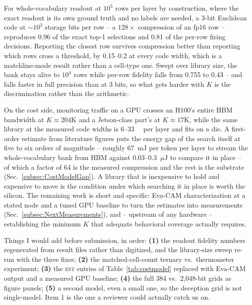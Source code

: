 For whole-vocabulary readout at $10^{5}$ rows per layer by construction,
where the exact readout is its own ground truth and no labels are needed,
a 3-bit Euclidean code at $\sim$$10^{3}$ storage bits per row -- a
$128\times$ compression of an fp16 row -- reproduces 0.96 of the exact
top-1 selections and 0.81 of the per-row firing decisions. Reporting the
closest row survives compression better than reporting which rows cross a
threshold, by 0.15--0.2 at every code width, which is a matchline-mode
result rather than a cell-type one. Swept over library size, the bank
stays alive to $10^{4}$ rows while per-row fidelity falls from 0.755 to
0.43 -- and falls faster in full precision than at 3 bits, so what gets
harder with $K$ is the discrimination rather than the arithmetic.

On the cost side, monitoring traffic on a GPU crosses an H100's entire
HBM bandwidth at $K\!\approx\!204$K and a Jetson-class part's at
$K\!\approx\!17$K, while the same library at the measured code widths is
6--\qty{33}{\mega\byte} per layer and fits on a die. A first-order
estimate from literature figures puts the energy gap of the search
itself at five to six orders of magnitude -- roughly 67~mJ per token
per layer to stream the whole-vocabulary bank from HBM against
0.03--0.3~$\mu$J to compare it in place -- of which a factor of 64 is
the measured compression and the rest is the substrate
(Sec.~\ref{subsec:CostModelGap}). A library that is inexpensive to
hold and expensive to move is the condition under which searching it
in place is worth the silicon. The remaining work is short and
specific: Eva-CAM characterization at a stated node and a tuned GPU
baseline to turn the estimates into measurements
(Sec.~\ref{subsec:NextMeasurements}), and -- upstream of any hardware
-- establishing the minimum $K$ that adequate behavioral coverage
actually requires.

\begin{pnote}
Things I would add before submission, in order: {\bf (1)} the readout
fidelity numbers regenerated from result files rather than digitized, and
the library-size sweep re-run with the three fixes; {\bf (2)} the
matched-cell-count ternary vs.\ thermometer experiment;
{\bf (3)} the \textsc{est} entries of Table~\ref{tab:costmodel}
replaced with Eva-CAM output and a measured GPU baseline; {\bf (4)} the full
384 vs.\ 2{,}048-bit grids as figure panels; {\bf (5)} a second model,
even a small one, so the deception grid is not single-model. Item 1 is
the one a reviewer could actually catch us on.
\end{pnote}
